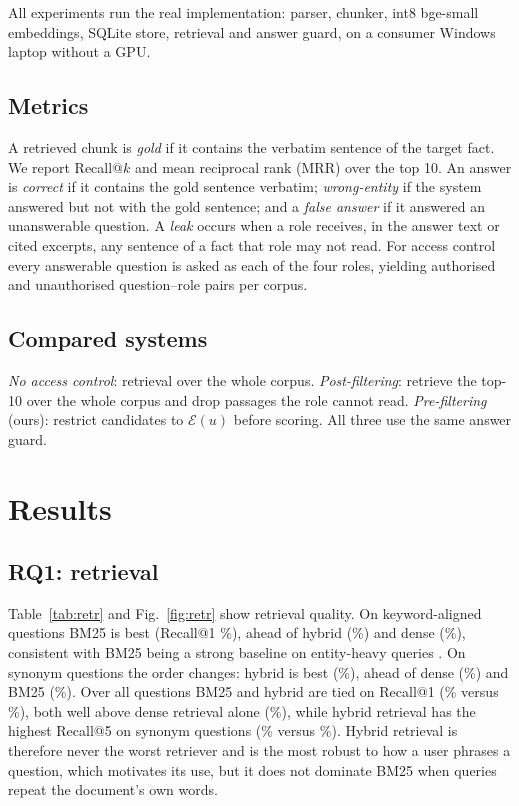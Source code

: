 \documentclass[journal]{IEEEtran}
\begin{document}
All experiments run the real implementation: parser, chunker, int8 bge-small embeddings, SQLite store, retrieval and answer guard, on a consumer Windows laptop without a GPU.

\subsection{Metrics}
A retrieved chunk is \emph{gold} if it contains the verbatim sentence of the target fact. We report Recall@$k$ and mean reciprocal rank (MRR) over the top 10. An answer is \emph{correct} if it contains the gold sentence verbatim; \emph{wrong-entity} if the system answered but not with the gold sentence; and a \emph{false answer} if it answered an unanswerable question. A \emph{leak} occurs when a role receives, in the answer text or cited excerpts, any sentence of a fact that role may not read. For access control every answerable question is asked as each of the four roles, yielding \AuthPairs{} authorised and \UnauthPairs{} unauthorised question--role pairs per corpus.

\subsection{Compared systems}
\emph{No access control}: retrieval over the whole corpus. \emph{Post-filtering}: retrieve the top-10 over the whole corpus and drop passages the role cannot read. \emph{Pre-filtering} (ours): restrict candidates to $\mathcal{E}(u)$ before scoring. All three use the same answer guard.

\section{Results}\label{sec:results}
\subsection{RQ1: retrieval}
Table~\ref{tab:retr} and Fig.~\ref{fig:retr} show retrieval quality. On keyword-aligned questions BM25 is best (Recall@1 \RKwBmOne\%), ahead of hybrid (\RKwHyOne\%) and dense (\RKwDnOne\%), consistent with BM25 being a strong baseline on entity-heavy queries \cite{thakur2021beir}. On synonym questions the order changes: hybrid is best (\RSynHyOne\%), ahead of dense (\RSynDnOne\%) and BM25 (\RSynBmOne\%). Over all questions BM25 and hybrid are tied on Recall@1 (\ROverallBm\% versus \ROverallHy\%), both well above dense retrieval alone (\ROverallDn\%), while hybrid retrieval has the highest Recall@5 on synonym questions (\RSynHyFive\% versus \RSynBmFive\%). Hybrid retrieval is therefore never the worst retriever and is the most robust to how a user phrases a question, which motivates its use, but it does not dominate BM25 when queries repeat the document's own words.
\end{document}
